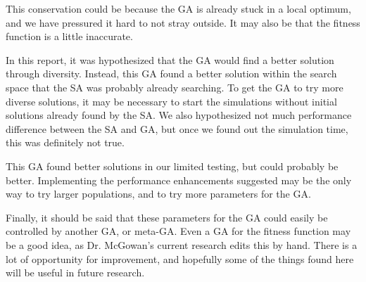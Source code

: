 This conservation could be because the GA is already stuck in a local optimum,
and we have pressured it hard to not stray outside. It may also be that the 
fitness function is a little inaccurate.

In this report, it was hypothesized that the GA would find a better solution
through diversity. Instead, this GA found a better solution within the search
space that the SA was probably already searching. To get the GA to try more 
diverse solutions, it may be necessary to start the simulations without
initial solutions already found by the SA. We also hypothesized not much
performance difference between the SA and GA, but once we found out the
simulation time, this was definitely not true.

This GA found better solutions in our limited testing, but could probably
be better. Implementing the performance enhancements suggested may be the only
way to try larger populations, and to try more parameters for the GA.

Finally, it should be said that these parameters for the GA could easily be
controlled by another GA, or meta-GA. Even a GA for the fitness function
may be a good idea, as Dr. McGowan's current research edits this by hand.
There is a lot of opportunity for improvement, and hopefully some of the 
things found here will be useful in future research.
